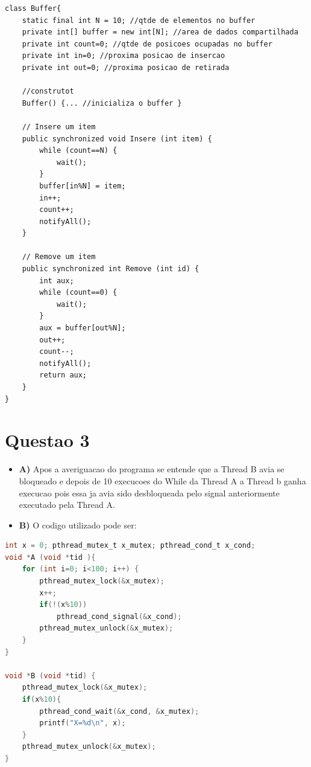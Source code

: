 \documentclass{article}
\begin{document}
\begin{shaded}
    \begin{lstlisting}[languge=java]
    class Buffer{
    static final int N = 10; //qtde de elementos no buffer
    private int[] buffer = new int[N]; //area de dados compartilhada
    private int count=0; //qtde de posicoes ocupadas no buffer
    private int in=0; //proxima posicao de insercao 
    private int out=0; //proxima posicao de retirada

    //construtot
    Buffer() {... //inicializa o buffer }

    // Insere um item
    public synchronized void Insere (int item) {
        while (count==N) {
            wait();
        }
        buffer[in%N] = item;
        in++;
        count++;
        notifyAll();
    }
    
    // Remove um item
    public synchronized int Remove (int id) {
        int aux;
        while (count==0) {
            wait();
        }
        aux = buffer[out%N];
        out++;
        count--;
        notifyAll();
        return aux;
    }
}

    \end{lstlisting}
\end{shaded}

\section{Questao 3}\label{questao-3}

\begin{itemize}
\tightlist
\item
  \textbf{A)} Apos a averiguacao do programa se entende que a Thread B
  avia se bloqueado e depois de 10 execucoes do While da Thread A a
  Thread b ganha execucao pois essa ja avia sido desbloqueada pelo
  signal anteriormente executado pela Thread A.
\item
  \textbf{B)} O codigo utilizado pode ser:
\end{itemize}

\begin{shaded}
    \begin{lstlisting}[language=c]
    int x = 0; pthread_mutex_t x_mutex; pthread_cond_t x_cond;
void *A (void *tid ){
    for (int i=0; i<100; i++) {
        pthread_mutex_lock(&x_mutex);
        x++;
        if(!(x%10))
            pthread_cond_signal(&x_cond);
        pthread_mutex_unlock(&x_mutex);
    }   
}

void *B (void *tid) {
    pthread_mutex_lock(&x_mutex);
    if(x%10){
        pthread_cond_wait(&x_cond, &x_mutex);
        printf("X=%d\n", x);
    }
    pthread_mutex_unlock(&x_mutex);
}

    \end{lstlisting}
\end{shaded}
\end{document}
